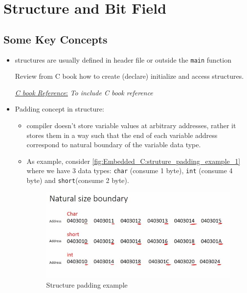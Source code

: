 \newpage
\section{Structure and Bit Field}
\label{Sec:Structure_bit_field}

\subsection{Some Key Concepts}

\begin{itemize}
    \item structures are usually defined in header file or outside the \verb|main| function
    
    Review from C book how to create (declare) initialize and access structures.
    
     \underline{\textit{C book Reference}:} \textit{To include C book reference} 
    
    
    \item Padding concept in structure:
    
    \begin{itemize}
        \item compiler doesn't store variable values at arbitrary addresses, rather it stores them in a way such that the end of each variable address correspond to natural boundary of the variable data type.
        
        
        \item As example, consider \autoref{fig:Embedded_C:struture_padding_example_1} where we have 3 data types: \verb|char| (consume 1 byte), \verb|int| (consume 4 byte) and \verb|short|(consume 2 byte).
        
        \begin{figure}[h]
\centering
\includegraphics[scale=0.55]{Figures/Embedded_C/struture_padding_example_1}
\caption{Structure padding example}
\label{fig:Embedded_C:struture_padding_example_1}
\end{figure}


\end{itemize}
\end{itemize}
